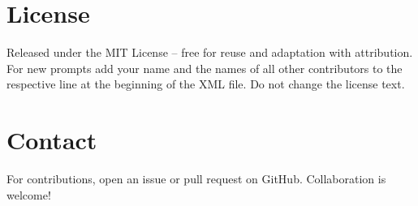 \documentclass[a4paper,11pt]{refart}
\begin{document}
\section{License}
Released under the MIT License -- free for reuse and adaptation with attribution. For new prompts add your name and the names of all other contributors to the respective line at the beginning of the XML file. Do not change the license text.

\section{Contact}
For contributions, open an issue or pull request on GitHub. Collaboration is welcome!

%
%
\printbibliography[heading=bibintoc]
\end{document}

